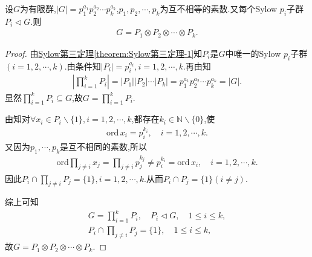 \documentclass[../../main.tex]{subfiles}%
\begin{document}
\begin{proposition}\label{proposition:抽象代数--群的内直积分解}
设$G$为有限群,$|G|=p_1^{a_1}p_2^{a_2}\cdots p_k^{a_k}$,$p_1,p_2,\cdots,p_k$为互不相等的素数.又每个Sylow $p_i$子群$P_i\lhd G$.则
\begin{align*}
G=P_1\otimes P_2\otimes\cdots\otimes P_k.
\end{align*}
\end{proposition}
\begin{proof}

由\hyperref[theorem:Sylow第三定理-1]{Sylow第三定理\ref{theorem:Sylow第三定理-1}}知$P_i$是$G$中唯一的Sylow $p_i$子群$(i=1,2,\cdots,k)$.由条件知$|P_i|=p_{i}^{a_i},i=1,2,\cdots,k$.再由知
\begin{align*}
\left| \prod\limits_{i=1}^k{P_i} \right|=|P_1||P_2|\cdots|P_k|=p_{1}^{a_1}p_{2}^{a_2}\cdots p_{k}^{a_k}=|G|.
\end{align*}
显然$\prod\limits_{i=1}^k{P_i}\subseteq G$,故$G=\prod\limits_{i=1}^k{P_i}$.

由知对$\forall x_i\in P_i\backslash\{1\},i=1,2,\cdots,k$,都存在$k_i\in\mathbb{N}\backslash\{0\}$,使
\begin{align*}
\mathrm{ord}\,x_i=p_{i}^{k_i},\quad i=1,2,\cdots,k.
\end{align*}
又因为$p_1,\cdots,p_k$是互不相同的素数,所以
\begin{align*}
\mathrm{ord}\prod\limits_{j\ne i}{x_j}=\prod\limits_{j\ne i}{p_{j}^{k_j}}\ne p_{i}^{k_i}=\mathrm{ord}\,x_i,\quad i=1,2,\cdots,k.
\end{align*}
因此$P_i\cap\prod\limits_{j\ne i}{P_j}=\{1\},i=1,2,\cdots,k$.从而$P_i\cap P_j=\{1\}(i\ne j)$.

综上可知
\begin{gather*}
G=\prod_{i=1}^k{P_i},\quad P_i\lhd G,\quad 1\leqslant i\leqslant k,
\\
P_i\cap \prod_{j\ne i}{P_j=\{1\},\quad 1}\leqslant i\leqslant k,
\end{gather*}
故$G=P_1\otimes P_2\otimes\cdots\otimes P_k$.




\end{proof}
\end{document}
